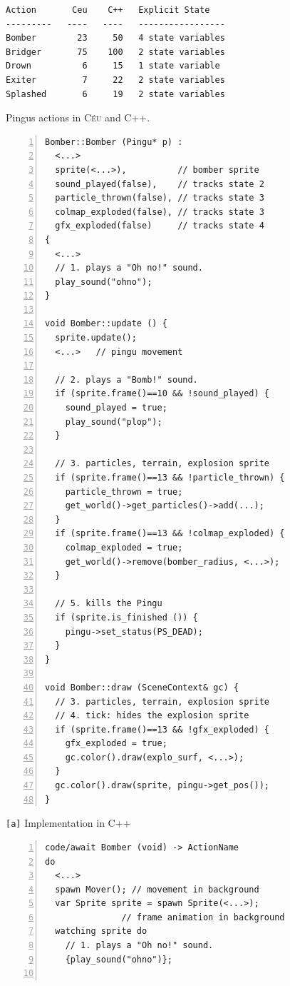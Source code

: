 \documentclass{vgtc}                          %
\newcommand{\CEU}{\textsc{C\'{e}u}\xspace}
\newcommand{\code}[1] {{\small{\texttt{#1}}}}
\newcommand{\ax}{\code{[a]}\xspace}
\begin{document}
\begin{figure}[t]
\begin{verbatim}
Action       Ceu    C++   Explicit State
---------   ----   ----   -----------------
Bomber        23     50   4 state variables
Bridger       75    100   2 state variables
Drown          6     15   1 state variable
Exiter         7     22   2 state variables
Splashed       6     19   2 state variables
\end{verbatim}
\caption{Pingus actions in \CEU and C++.
\label{tab.actions}
}
\end{figure}

\begin{figure}[!t]
\begin{minipage}[t]{0.50\linewidth}
\begin{lstlisting}[numbers=left,xleftmargin=3em]
Bomber::Bomber (Pingu* p) :
  <...>
  sprite(<...>),          // bomber sprite
  sound_played(false),    // tracks state 2
  particle_thrown(false), // tracks state 3
  colmap_exploded(false), // tracks state 3
  gfx_exploded(false)     // tracks state 4
{
  <...>
  // 1. plays a "Oh no!" sound.
  play_sound("ohno");
}

void Bomber::update () {
  sprite.update();
  <...>   // pingu movement

  // 2. plays a "Bomb!" sound.
  if (sprite.frame()==10 && !sound_played) {
    sound_played = true;
    play_sound("plop");
  }

  // 3. particles, terrain, explosion sprite
  if (sprite.frame()==13 && !particle_thrown) {
    particle_thrown = true;
    get_world()->get_particles()->add(...);
  }
  if (sprite.frame()==13 && !colmap_exploded) {
    colmap_exploded = true;
    get_world()->remove(bomber_radius, <...>);
  }

  // 5. kills the Pingu
  if (sprite.is_finished ()) {
    pingu->set_status(PS_DEAD);
  }
}

void Bomber::draw (SceneContext& gc) {
  // 3. particles, terrain, explosion sprite
  // 4. tick: hides the explosion sprite
  if (sprite.frame()==13 && !gfx_exploded) {
    gfx_exploded = true;
    gc.color().draw(explo_surf, <...>);
  }
  gc.color().draw(sprite, pingu->get_pos());
}
\end{lstlisting}
\centering\small{\ax Implementation in C++}
\end{minipage}
%
\begin{minipage}[t]{0.50\linewidth}
\begin{lstlisting}[numbers=left,xleftmargin=3em]
code/await Bomber (void) -> ActionName
do
  <...>
  spawn Mover(); // movement in background
  var Sprite sprite = spawn Sprite(<...>);
               // frame animation in background
  watching sprite do
    // 1. plays a "Oh no!" sound.
    {play_sound("ohno")};


\end{lstlisting}
\end{minipage}
\end{figure}
\end{document}
